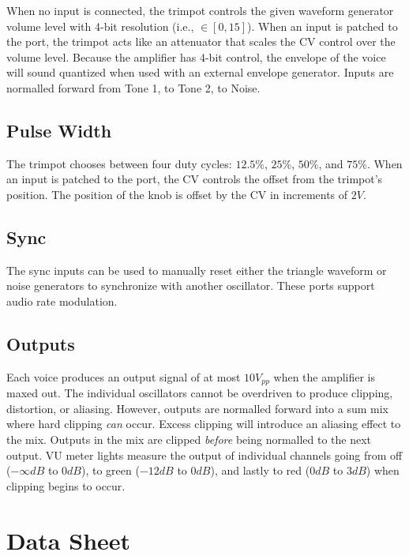 \documentclass[12pt,letter]{article}
\begin{document}
When no input is connected, the trimpot controls the given waveform generator volume level with 4-bit resolution (i.e., $\in [0, 15]$). When an input is patched to the port, the trimpot acts like an attenuator that scales the CV control over the volume level. Because the amplifier has 4-bit control, the envelope of the voice will sound quantized when used with an external envelope generator. Inputs are normalled forward from Tone 1, to Tone 2, to Noise.

\subsection{Pulse Width}

The trimpot chooses between four duty cycles: $12.5\%$, $25\%$, $50\%$, and $75\%$. When an input is patched to the port, the CV controls the offset from the trimpot's position. The position of the knob is offset by the CV in increments of $2V$.

\subsection{Sync}

The sync inputs can be used to manually reset either the triangle waveform or noise generators to synchronize with another oscillator. These ports support audio rate modulation.

\subsection{Outputs}

Each voice produces an output signal of at most $10V_{pp}$ when the amplifier is maxed out. The individual oscillators cannot be overdriven to produce clipping, distortion, or aliasing. However, outputs are normalled forward into a sum mix where hard clipping \textit{can} occur. Excess clipping will introduce an aliasing effect to the mix. Outputs in the mix are clipped \textit{before} being normalled to the next output. VU meter lights measure the output of individual channels going from off ($-\infty dB$ to $0dB$), to green ($-12dB$ to $0dB$), and lastly to red ($0dB$ to $3dB$) when clipping begins to occur.


\clearpage
\section{Data Sheet}
\end{document}

